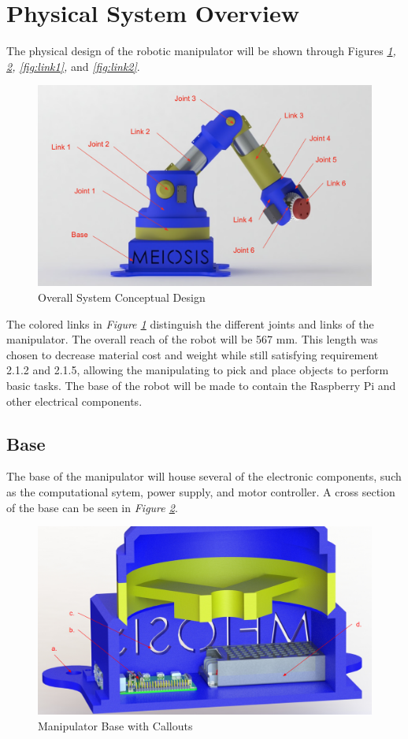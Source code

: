 \documentclass[12pt]{report}
\begin{document}
\section{Physical System Overview}
\vspace{-.75\baselineskip}
The physical design of the robotic manipulator will be shown through Figures \emph{\ref{fig:overall}, \ref{fig:base}, \ref{fig:link1},} and \emph{\ref{fig:link2}}.

\begin{figure}[htp]
  \centering
  \includegraphics[frame, width=.75\textwidth]{overall_render}
  \caption{Overall System Conceptual Design }
  \label{fig:overall}
\end{figure}

The colored links in \emph{Figure \ref{fig:overall}} distinguish the different joints and links of the manipulator. The overall reach of the robot will be 567 mm. This length was chosen to decrease material cost and weight while still satisfying requirement 2.1.2 and 2.1.5, allowing the manipulating to pick and place objects to perform basic tasks. The base of the robot will be made to contain the Raspberry Pi and other electrical components.
\newpage
\subsection{Base}
The base of the manipulator will house several of the electronic components, such as the computational sytem, power supply, and motor controller. A cross section of the base can be seen in \emph{Figure \ref{fig:base}}.
\begin{figure}[htp]
  \centering
  \includegraphics[frame, width=.75\textwidth]{base_callouts}
  \caption{Manipulator Base with Callouts}
  \label{fig:base}
\end{figure}
\end{document}
